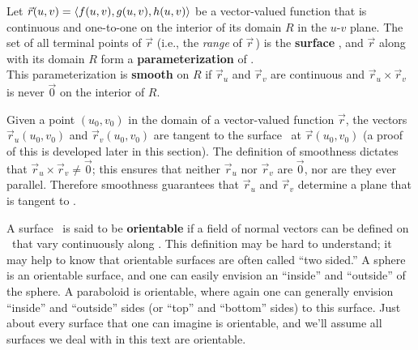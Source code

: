 
\begin{definition}\label{def:parameterized_surface}%
Let $\vec r(u,v) = \left\langle f(u,v),g(u,v),h(u,v)\right\rangle$ be a vector-valued function that is continuous and one-to-one on the interior of its domain $R$ in the $u$-$v$ plane. The set of all terminal points of $\vec r$ (i.e., the \emph{range} of $\vec r$\,) is the \textbf{surface} \surfaceS, and $\vec r$ along with its domain $R$ form a \textbf{parameterization} of \surfaceS.\bigskip\\
This parameterization is \textbf{smooth} on $R$ if $\vec r_u$ and $\vec r_v$ are continuous and $\vec r_u\times \vec r_v$ is never $\vec 0$ on the interior of $R$.
\end{definition}

Given a point $(u_0,v_0)$ in the domain of a vector-valued function $\vec r$, the vectors $\vec r_u(u_0,v_0)$ and $\vec r_v(u_0,v_0)$ are tangent to the surface \surfaceS\ at $\vec r(u_0,v_0)$ (a proof of this is developed later in this section). The definition of smoothness dictates that $\vec r_u\times \vec r_v \neq \vec 0$; this ensures that neither $\vec r_u$ nor $\vec r_v$ are $\vec 0$, nor are they ever parallel. Therefore smoothness guarantees that $\vec r_u$ and $\vec r_v$ determine a plane that is tangent to \surfaceS.


A surface \surfaceS\ is said to be \textbf{orientable} if a field of normal vectors can be defined on \surfaceS\ that vary continuously along \surfaceS. This definition may be hard to understand; it may help to know that orientable surfaces are often called ``two sided.'' A sphere is an orientable surface, and one can easily envision an ``inside'' and ``outside'' of the sphere. A paraboloid is orientable, where again one can generally envision  ``inside'' and ``outside'' sides (or ``top'' and ``bottom'' sides) to this surface. Just about every surface that one can imagine is orientable, and we'll assume all surfaces we deal with in this text are orientable.

